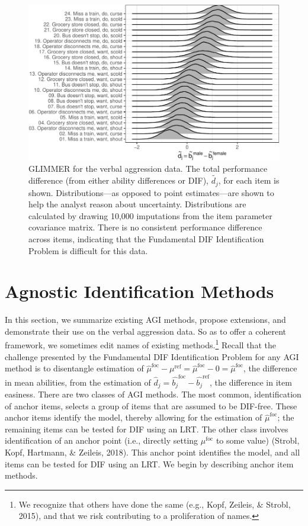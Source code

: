 \documentclass[
  english,
  man,floatsintext]{apa6}
\begin{document}
\begin{figure}[H]

{\centering \includegraphics{paper_apa_files/figure-latex/emmilg-1} 

}

\caption{GLIMMER for the verbal aggression data. The total performance difference (from either ability differences or DIF), $\tilde{{d_j}}$, for each item is shown. Distributions—as opposed to point estimates—are shown to help the analyst reason about uncertainty. Distributions are calculated by drawing 10,000 imputations from the item parameter covariance matrix. There is no consistent performance difference across items, indicating that the Fundamental DIF Identification Problem is difficult for this data.}\label{fig:emmilg}
\end{figure}

\hypertarget{aimethods}{%
\section{Agnostic Identification Methods}\label{aimethods}}

In this section, we summarize existing AGI methods, propose extensions, and demonstrate their use on the verbal aggression data. So as to offer a coherent framework, we sometimes edit names of existing methods.\footnote{We recognize that others have done the same (e.g., Kopf, Zeileis, \& Strobl, 2015), and that we risk contributing to a proliferation of names.} Recall that the challenge presented by the Fundamental DIF Identification Problem for any AGI method is to disentangle estimation of \(\hat\mu^\text{foc} - \mu^\text{ref} = \hat\mu^\text{foc} - 0 = \hat\mu^\text{foc}\), the difference in mean abilities, from the estimation of \(\hat d_j = \hat{b_j}^{\text{foc}} - \hat{b_j}^{\text{ref}}\), the difference in item easiness. There are two classes of AGI methods. The most common, identification of anchor items, selects a group of items that are assumed to be DIF-free. These anchor items identify the model, thereby allowing for the estimation of \(\hat\mu^\text{foc}\); the remaining items can be tested for DIF using an LRT. The other class involves identification of an anchor point (i.e., directly setting \(\mu^{\text{foc}}\) to some value) (Strobl, Kopf, Hartmann, \& Zeileis, 2018). This anchor point identifies the model, and all items can be tested for DIF using an LRT. We begin by describing anchor item methods.
\end{document}
